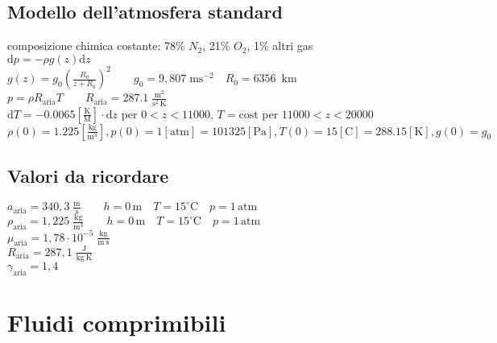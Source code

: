 \documentclass[11pt,a4paper]{report}
\newcommand{\de}{\mathrm d}
\begin{document}
    \section*{Modello dell'atmosfera standard}
	composizione chimica costante: 78\% $N_2$, 21\% $O_2$, 1\% altri gas\\
	$\de p=-\rho g(z)\de z$\\
	$g(z)=g_0(\frac{R_0}{z+R_0})^2\qquad g_0=9,807\;\mathrm{ms^{-2}}\quad R_0=6356\,\text{ km}$\\
	$p=\rho R_\mathrm{aria}T\qquad R_\mathrm{aria}=287.1\;\mathrm{\frac{m^2}{s^2\,K}}$\\
	$\de T=-0.0065\mathrm{[\frac{K}{M}]}\!\cdot\!\de z$ per $0<z<11000$, $T=\mathrm{cost}$ per $11000<z<20000$\\
	$\rho(0)=1.225\mathrm{[\frac{kg}{m^3}]},p(0)=1\mathrm{[atm]}=101325\mathrm{[Pa]},T(0)=15\mathrm{[C]}=288.15\mathrm{[K]},g(0)=g_0$
	
	\section*{Valori da ricordare}
	$a_\mathrm{aria}=340,3\;\mathrm{\frac ms}\qquad h=0\,\text{m}\quad T=15^\circ\text{C}\quad p=1\,\text{atm}$\\
	$\rho_\mathrm{aria}=1,225\;\mathrm{\frac{kg}{m^3}}\qquad h=0\,\text{m}\quad T=15^\circ\text{C}\quad p=1\,\text{atm}$\\
	$\mu_\mathrm{aria}=1,78\cdot 10^{-5}\;\mathrm{\frac{kg}{m\:s}}$\\
	$R_\mathrm{aria}=287,1\;\mathrm{\frac{J}{kg\:K}}$\\
	$\gamma_\mathrm{aria}=1,4$



\chapter{Fluidi comprimibili}
\end{document}
